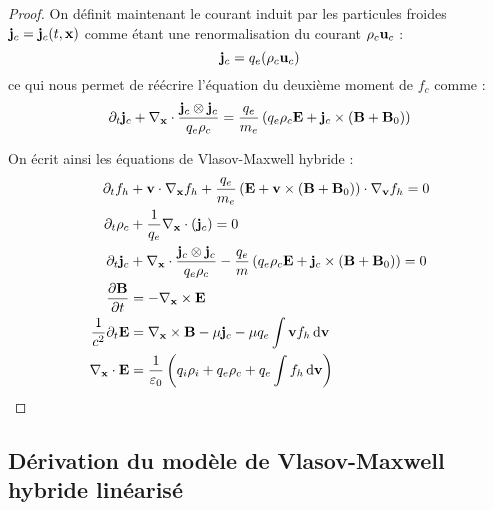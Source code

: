 \begin{proof}
  On définit maintenant le courant induit par les particules froides $\vb{j}_c=\vb{j}_c(t,\vb{x})$ comme étant une renormalisation du courant $\rho_c\vb{u}_c$ :
  $$
    \vb{j}_c = q_e(\rho_c\vb{u}_c)
  $$
  ce qui nous permet de réécrire l'équation du deuxième moment de $f_c$ comme :
  $$
    \partial_t\vb{j}_c + \nabla_{\vb{x}}\cdot\frac{\vb{j}_c\otimes\vb{j}_c}{q_e\rho_c} = \frac{q_e}{m_e}\left( q_e\rho_c\vb{E} + \vb{j}_c\times(\vb{B}+\vb{B}_0) \right)
  $$

  On écrit ainsi les équations de Vlasov-Maxwell hybride :
  \begin{align}
      \partial_t f_h &+ \vb{v}\cdot\nabla_{\vb{x}} f_h + \frac{q_e}{m_e}\left( \vb{E} + \vb{v}\times(\vb{B}+\vb{B}_0) \right)\cdot\nabla_{\vb{v}} f_h = 0 \\
      \partial_t\rho_c &+ \frac{1}{q_e}\nabla_{\vb{x}}\cdot(\vb{j}_c) = 0 \\
      \partial_t\vb{j}_c &+ \nabla_{\vb{x}}\cdot\frac{\vb{j}_c\otimes\vb{j}_c}{q_e\rho_c} - \frac{q_e}{m}\left( q_e\rho_c\vb{E} + \vb{j}_c\times(\vb{B}+\vb{B}_0) \right) = 0 \\
      \pdv{\vb{B}}{t} &= - \nabla_{\vb{x}}\times\vb{E} \\
      \frac{1}{c^2}\partial_t\vb{E} &= \nabla_{\vb{x}}\times \vb{B} - \mu\vb{j}_c - \mu q_e\int \vb{v} f_h\dd{\vb{v}} \\
      \nabla_{\vb{x}}\cdot\vb{E} &= \frac{1}{\varepsilon_0}\left( q_i\rho_i + q_e\rho_c + q_e\int f_h\dd{\vb{v}} \right)
  \end{align}
\end{proof}

\subsection{Dérivation du modèle de Vlasov-Maxwell hybride linéarisé}
\label{ssec:0:vmhl}

